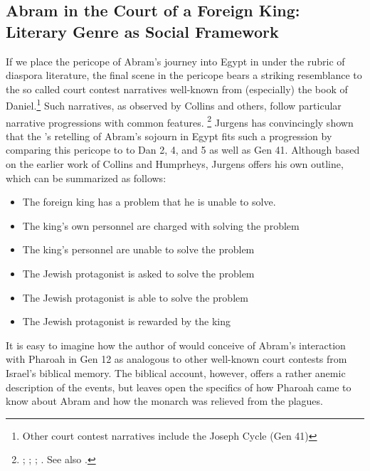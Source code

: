 \subsection{Abram in the Court of a Foreign King: Literary Genre as Social Framework}

If we place the pericope of Abram's journey into Egypt in \ga under the rubric of diaspora literature, the final scene in the pericope bears a striking resemblance to the so called court contest narratives well-known from (especially) the book of Daniel.\footnote{Other court contest narratives include the Joseph Cycle (Gen 41)} Such narratives, as observed by Collins and others, follow particular narrative progressions with common features.%
%
\footnote{\cite[TODO: pages]{collins1993}; \cite{humphreys_jbl1973}; \cite{collins_jbl1975}; \cite{wills1990}. See also \cite{niditch-doran_jbl1977}.}
%
Jurgens has convincingly shown %
that the \ga's retelling of Abram's sojourn in Egypt fits such a progression by comparing this pericope to to Dan 2, 4, and 5 as well as Gen 41. Although based on the earlier work of Collins and Humprheys, Jurgens offers his own outline, which can be summarized as follows\autocite[21]{jurgens_jsj2018}:

\begin{SingleSpace}
\begin{itemize}
    \item The foreign king has a problem that he is unable to solve.
    \item The king's own personnel are charged with solving the problem
    \item The king's personnel are unable to solve the problem
    \item The Jewish protagonist is asked to solve the problem
    \item The Jewish protagonist is able to solve the problem
    \item The Jewish protagonist is rewarded by the king
\end{itemize}
\end{SingleSpace}

It is easy to imagine how the author of \ga would conceive of Abram's interaction with Pharoah in Gen 12 as analogous to other well-known court contests from Israel's biblical memory. %
The biblical account, however, offers a rather anemic description of the events, but leaves open the specifics of how Pharoah came to know about Abram and how the monarch was relieved from the plagues. 

